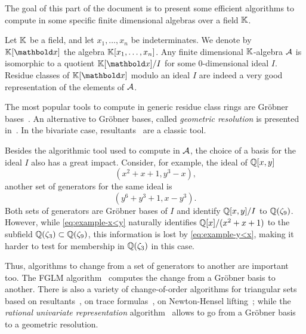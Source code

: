 

The goal of this part of the document is to present some efficient
algorithms to compute in some specific finite dimensional algebras
over a field $\mathbb{K}$.

Let $\mathbb{K}$ be a field, and let $x_1,\ldots,x_n$ be indeterminates. We
denote by $\K[\lst{x}]$ the algebra $\mathbb{K}[x_1,\ldots,x_n]$. Any finite
dimensional $\mathbb{K}$-algebra $\mathcal{A}$ is isomorphic to a quotient
$\K[\lst{x}]/I$ for some $0$-dimensional ideal $I$. Residue classes of
$\K[\lst{x}]$ modulo an ideal $I$ are indeed a very good
representation of the elements of $\mathcal{A}$.

The most popular tools to compute in generic residue class rings are
Gröbner
bases~\cite{buchberger,cox+little+oshea,Cox-Little-OShea:UAG2005,faugere99,faugere02}.
An alternative to Gröbner bases, called \emph{geometric resolution} is
presented in~\cite{giusti+lecerf+salvy01}. In the bivariate case,
resultants~\cite{cox+little+oshea,Cox-Little-OShea:UAG2005} are a
classic tool.

Besides the algorithmic tool used to compute in $\mathcal{A}$, the
choice of a basis for the ideal $I$ also has a great impact. Consider,
for example, the ideal of $\mathbb{Q}[x,y]$
\begin{equation}
  \label{eq:example-x<y}
  (x^2 + x + 1, y^3 - x)
  \text{,}
\end{equation}
another set of generators for the same ideal is
\begin{equation}
  \label{eq:example-y<x}
  (y^6 + y^3 + 1, x - y^3)
  \text{.}
\end{equation}
Both sets of generators are Gröbner bases of $I$ and identify
$\mathbb{Q}[x,y]/I$ to $\mathbb{Q}(\zeta_9)$. However, while \eqref{eq:example-x<y}
naturally identifies $\mathbb{Q}[x]/(x^2+x+1)$ to the subfield
$\mathbb{Q}(\zeta_3)\subset\mathbb{Q}(\zeta_9)$, this information is lost by
\eqref{eq:example-y<x}, making it harder to test for membership in
$\mathbb{Q}(\zeta_3)$ in this case.

Thus, algorithms to change from a set of generators to another are
important too. The FGLM algorithm~\cite{FGLM} computes the change from
a Gröbner basis to another. There is also a variety of change-of-order
algorithms for triangular sets based on
resultants~\cite{boulier+lemaire+moreno01}, on trace
formulas~\cite{diaz+gonzalez01,pascal+schost06}, on Newton-Hensel
lifting~\cite{dahan+jin+moreno+schost08}; while the \emph{rational
  univariate representation} algorithm~\cite{rouiller99} allows to go
from a Gröbner basis to a geometric resolution.

